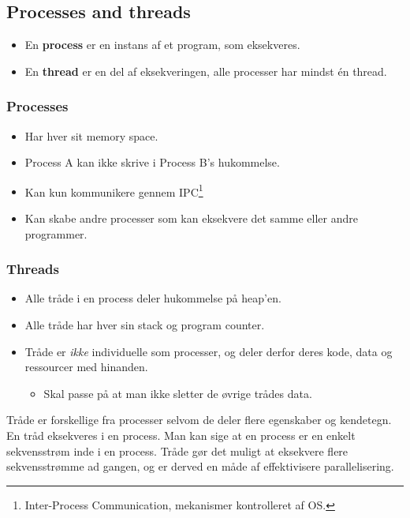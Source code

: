 \newpage

\subsection{Processes and threads}
\begin{itemize}
	\item En \textbf{process} er en instans af et program, som eksekveres.
	\item En \textbf{thread} er en del af eksekveringen, alle processer har mindst én thread.
\end{itemize}

\subsubsection*{Processes}
\begin{itemize}
	\item Har hver sit memory space.
	\item Process A kan ikke skrive i Process B's hukommelse.
	\item Kan kun kommunikere gennem IPC\footnote{Inter-Process Communication, mekanismer kontrolleret af OS.}
	\item Kan skabe andre processer som kan eksekvere det samme eller andre programmer.
\end{itemize}

\subsubsection*{Threads}
\begin{itemize}
	\item Alle tråde i en process deler hukommelse på heap'en.
	\item Alle tråde har hver sin stack og program counter.
	\item Tråde er \textit{ikke} individuelle som processer, og deler derfor deres kode, data og ressourcer med hinanden.
	\begin{itemize}
		\item Skal passe på at man ikke sletter de øvrige trådes data.
	\end{itemize}
\end{itemize}

Tråde er forskellige fra processer selvom de deler flere egenskaber og kendetegn. En tråd eksekveres i en process. Man kan sige at en process er en enkelt sekvensstrøm inde i en process.
Tråde gør det muligt at eksekvere flere sekvensstrømme ad gangen, og er derved en måde af effektivisere parallelisering.
	
